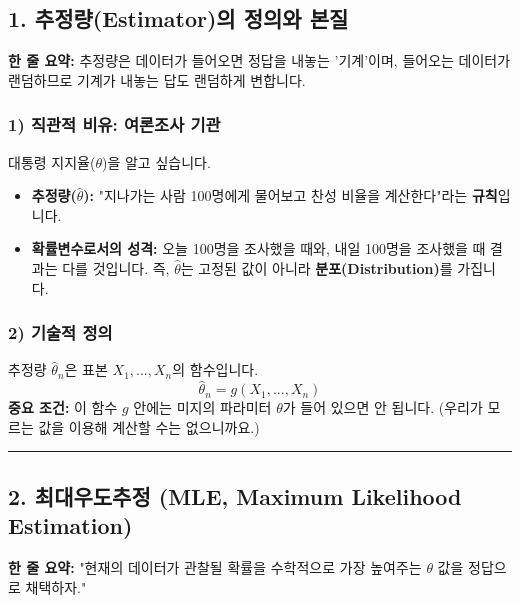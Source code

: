 \documentclass[11pt,a4paper]{book}
\theoremstyle{definition}
\begin{document}
\subsection{1. 추정량(Estimator)의 정의와 본질}

\begin{conceptbox}[title={개념 1: 추정량은 숫자가 아니라 '함수'이자 '확률변수'다}]
\textbf{한 줄 요약:} 추정량은 데이터가 들어오면 정답을 내놓는 '기계'이며, 들어오는 데이터가 랜덤하므로 기계가 내놓는 답도 랜덤하게 변합니다.
\end{conceptbox}

\subsubsection*{1) 직관적 비유: 여론조사 기관}
대통령 지지율($\theta$)을 알고 싶습니다.
\begin{itemize}
    \item \textbf{추정량($\hat{\theta}$):} "지나가는 사람 100명에게 물어보고 찬성 비율을 계산한다"라는 \textbf{규칙}입니다.
    \item \textbf{확률변수로서의 성격:} 오늘 100명을 조사했을 때와, 내일 100명을 조사했을 때 결과는 다를 것입니다. 즉, $\hat{\theta}$는 고정된 값이 아니라 \textbf{분포(Distribution)}를 가집니다.
\end{itemize}

\subsubsection*{2) 기술적 정의}
추정량 $\hat{\theta}_n$은 표본 $X_1, ..., X_n$의 함수입니다.
$$ \hat{\theta}_n = g(X_1, ..., X_n) $$
\textbf{중요 조건:} 이 함수 $g$ 안에는 미지의 파라미터 $\theta$가 들어 있으면 안 됩니다. (우리가 모르는 값을 이용해 계산할 수는 없으니까요.)

\vspace{0.5cm}\hrule\vspace{0.5cm}

\subsection{2. 최대우도추정 (MLE, Maximum Likelihood Estimation)}


\begin{conceptbox}[title={개념 2: 가장 그럴듯한 범인 찾기}]
\textbf{한 줄 요약:} "현재의 데이터가 관찰될 확률을 수학적으로 가장 높여주는 $\theta$ 값을 정답으로 채택하자."
\end{conceptbox}
\end{document}

